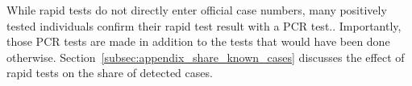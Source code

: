 While rapid tests do not directly enter official case numbers, many positively tested
individuals confirm their rapid test result with a PCR test.. Importantly,
those PCR tests are made in addition to the tests that would have been done otherwise.
Section~\ref{subsec:appendix_share_known_cases} discusses the effect of rapid tests on
the share of detected cases.